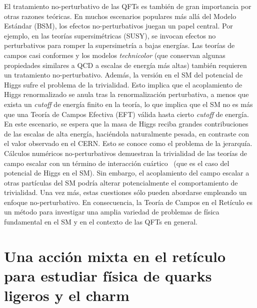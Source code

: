 El tratamiento no-perturbativo de las QFTs es también de gran importancia por otras razones teóricas. En muchos escenarios populares más allá del Modelo Estándar (BSM), los efectos no-perturbativos juegan un papel central. Por ejemplo, en las teorías supersimétricas (SUSY), se invocan efectos no perturbativos para romper la supersimetría a bajas energías. Las teorías de campos casi conformes y los modelos \textit{technicolor} (que conservan algunas propiedades similares a QCD a escalas de energía más altas) también requieren un tratamiento no-perturbativo.  Además, la versión en el SM del potencial de Higgs sufre el problema de la trivialidad. Esto implica que el acoplamiento de Higgs renormalizado se anula tras la renormalización perturbativa, a menos que exista un \textit{cutoff} de energía finito en la teoría, lo que implica que el SM no es más que una Teoría de Campos Efectiva (EFT) válida hasta cierto \textit{cutoff} de energía. En este escenario, se espera que la masa de Higgs reciba grandes contribuciones de las escalas de alta energía, haciéndola naturalmente pesada, en contraste con el valor observado en el CERN. Esto se conoce como el problema de la jerarquía. Cálculos numéricos no-perturbativos demuestran la trivialidad de las teorías de campo escalar con un término de interacción cuártico~\citep{Luscher:1987ek} (que es el caso del potencial de Higgs en el SM). Sin embargo, el acoplamiento del campo escalar a otras partículas del SM podría alterar potencialmente el comportamiento de trivialidad. Una vez más, estas cuestiones sólo pueden abordarse empleando un enfoque no-perturbativo. En consecuencia, la Teoría de Campos en el Retículo es un método para investigar una amplia variedad de problemas de física fundamental en el SM y en el contexto de las QFTs en general.

\section*{Una acción mixta en el retículo para estudiar física de quarks ligeros y el charm} 
